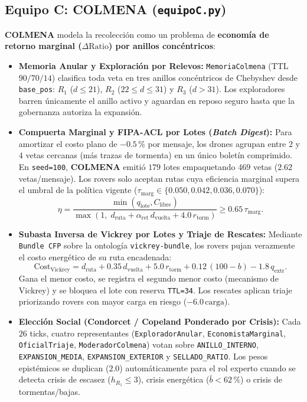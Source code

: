 \documentclass[10pt,a4paper]{article}
\begin{document}
\subsection{Equipo C: COLMENA (\texttt{equipoC.py})}
\textbf{COLMENA} modela la recolección como un problema de \textbf{economía de retorno marginal ($\Delta\text{Ratio}$) por anillos concéntricos}:
\begin{itemize}
  \item \textbf{Memoria Anular y Exploración por Relevos:} \texttt{MemoriaColmena} (TTL $90/70/14$) clasifica toda veta en tres anillos concéntricos de Chebyshev desde \texttt{base\_pos}: $R_1$ ($d \le 21$), $R_2$ ($22 \le d \le 31$) y $R_3$ ($d > 31$). Los exploradores barren únicamente el anillo activo y aguardan en reposo seguro hasta que la gobernanza autoriza la expansión.
  \item \textbf{Compuerta Marginal y FIPA-ACL por Lotes (\emph{Batch Digest}):} Para amortizar el costo plano de $-0.5\,\%$ por mensaje, los drones agrupan entre $2$ y $4$ vetas cercanas (más trazas de tormenta) en un único boletín comprimido. En \texttt{seed=100}, \textbf{COLMENA} emitió $179$ lotes empaquetando $469$ vetas ($2.62$ vetas/mensaje). Los rovers solo aceptan rutas cuya eficiencia marginal supera el umbral de la política vigente ($\tau_{\text{marg}} \in \{0.050, 0.042, 0.036, 0.070\}$):
  \begin{equation}
    \eta = \frac{\min(q_{\text{lote}}, C_{\text{libre}})}{\max(1,\; d_{\text{ruta}} + \alpha_{\text{ret}}\, d_{\text{vuelta}} + 4.0\,r_{\text{torm}})} \ge 0.65\,\tau_{\text{marg}}.
  \end{equation}
  \item \textbf{Subasta Inversa de Vickrey por Lotes y Triaje de Rescates:} Mediante \texttt{Bundle CFP} sobre la ontología \texttt{vickrey-bundle}, los rovers pujan verazmente el costo energético de su ruta encadenada:
  \begin{equation}
    \text{Cost}_{\text{Vickrey}} = d_{\text{ruta}} + 0.35\,d_{\text{vuelta}} + 5.0\,r_{\text{torm}} + 0.12\,(100 - b) - 1.8\,q_{\text{extr}}.
  \end{equation}
  Gana el menor costo, se registra el segundo menor costo (mecanismo de Vickrey) y se bloquea el lote con reserva \texttt{TTL=34}. Los rescates aplican triaje priorizando rovers con mayor carga en riesgo ($-6.0\,\text{carga}$).
  \item \textbf{Elección Social (Condorcet / Copeland Ponderado por Crisis):} Cada $26$ ticks, cuatro representantes (\texttt{ExploradorAnular}, \texttt{EconomistaMarginal}, \texttt{OficialTriaje}, \texttt{ModeradorColmena}) votan sobre \texttt{ANILLO\_INTERNO}, \texttt{EXPANSION\_MEDIA}, \texttt{EXPANSION\_EXTERIOR} y \texttt{SELLADO\_RATIO}. Los pesos epistémicos se duplican ($2.0$) automáticamente para el rol experto cuando se detecta crisis de escasez ($h_{R_1}\le 3$), crisis energética ($\bar{b} < 62\,\%$) o crisis de tormentas/bajas.
\end{itemize}
\end{document}
